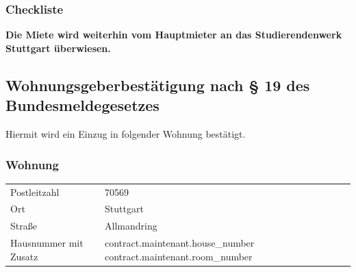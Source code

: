 \documentclass[9pt,pdftex,a4paper]{article}
\begin{document}
{{{{{{{{\subsubsection*{Checkliste}
\bigskip

{\color{red}\textbf{Die Miete wird weiterhin vom Hauptmieter an das Studierendenwerk Stuttgart überwiesen.}}


%
%

\newpage

\subsection*{Wohnungsgeberbestätigung nach § 19 des Bundesmeldegesetzes}

Hiermit wird ein Einzug in folgender Wohnung bestätigt.

\subsubsection*{Wohnung}
\begin{tabularx}{\textwidth}{XX}
Postleitzahl &  70569\\
Ort &  Stuttgart\\
Straße & Allmandring\\
Hausnummer mit Zusatz & {{ contract.maintenant.house_number }} {{ contract.maintenant.room_number }}\\
\end{tabularx}\bigskip

}}}}}}}}
\end{document}
